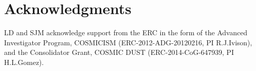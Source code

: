 \documentclass[useAMS,usenatbib]{mn2e}
\def\mic{ $\mu $m\,}
\begin{document}




\section*{Acknowledgments}

LD and SJM acknowledge support from the ERC in the form of the
Advanced Investigator Program, COSMICISM (ERC-2012-ADG-20120216, PI
R.J.Ivison), and the Consolidator Grant, COSMIC DUST
(ERC-2014-CoG-647939, PI H.L.Gomez). 
\end{document}
